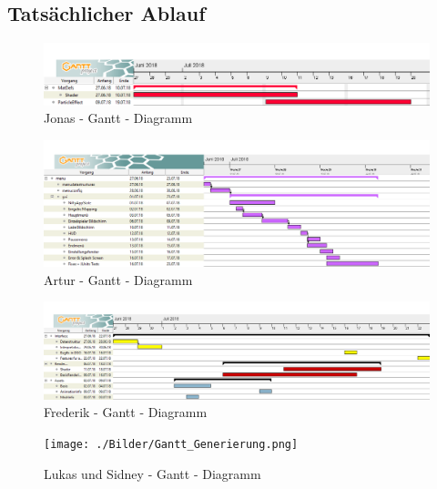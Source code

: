\documentclass[parskip=full]{scrartcl}
\begin{document}
	\pagebreak

	\subsection{Tatsächlicher Ablauf}
	\begin{figure}[htbp]
		\centering
		\includegraphics[width=\linewidth]{./Bilder/GanttJonas.png}
		\caption{Jonas - Gantt - Diagramm}
	\end{figure}
	\begin{figure}[htbp]
		\centering
		\includegraphics[width=\linewidth]{./Bilder/GanttArtur.png}
		\caption{Artur - Gantt - Diagramm}
	\end{figure}
	\begin{figure}[htbp]
		\centering
		\includegraphics[width=\linewidth]{./Bilder/GanttFrederik.png}
		\caption{Frederik - Gantt - Diagramm}
	\end{figure}
	\begin{figure}[htbp]
		\centering
		\texttt{[image: ./Bilder/Gantt\_Generierung.png]}
		\caption{Lukas und Sidney - Gantt - Diagramm}
	\end{figure}
\end{document}
